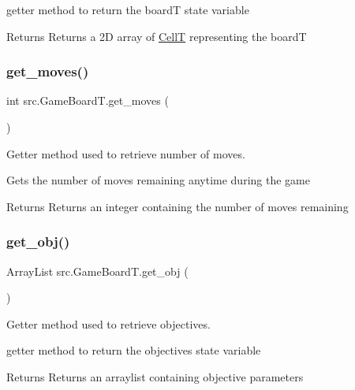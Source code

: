 getter method to return the boardT state variable \begin{DoxyReturn}{Returns}
Returns a 2D array of \hyperlink{enumsrc_1_1CellT}{CellT} representing the boardT 
\end{DoxyReturn}
\mbox{\label{classsrc_1_1GameBoardT_a75882ae5dee750812077cfd8d4ca2f93}} 
\subsubsection{\texorpdfstring{get\+\_\+moves()}{get\_moves()}}
{\footnotesize\ttfamily int src.\+Game\+Board\+T.\+get\+\_\+moves (\begin{DoxyParamCaption}{ }\end{DoxyParamCaption})}



Getter method used to retrieve number of moves. 

Gets the number of moves remaining anytime during the game \begin{DoxyReturn}{Returns}
Returns an integer containing the number of moves remaining 
\end{DoxyReturn}
\mbox{\label{classsrc_1_1GameBoardT_ae878d201048e4cb169890f35e825e66c}} 
\subsubsection{\texorpdfstring{get\+\_\+obj()}{get\_obj()}}
{\footnotesize\ttfamily Array\+List src.\+Game\+Board\+T.\+get\+\_\+obj (\begin{DoxyParamCaption}{ }\end{DoxyParamCaption})}



Getter method used to retrieve objectives. 

getter method to return the objectives state variable \begin{DoxyReturn}{Returns}
Returns an arraylist containing objective parameters 
\end{DoxyReturn}
\mbox{\label{classsrc_1_1GameBoardT_a492ab6d3f4f02b3dac168ab54cb11917}} 
